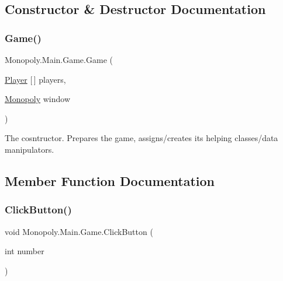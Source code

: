 \subsection{Constructor \& Destructor Documentation}
\mbox{\label{class_monopoly_1_1_main_1_1_game_ae2591415ce9bb2ca618cf67cc000792c}} 
\subsubsection{\texorpdfstring{Game()}{Game()}}
{\footnotesize\ttfamily Monopoly.\+Main.\+Game.\+Game (\begin{DoxyParamCaption}\item[{\mbox{\hyperlink{class_monopoly_1_1_players_1_1_player}{Player}} \mbox{[}$\,$\mbox{]}}]{players,  }\item[{\mbox{\hyperlink{class_monopoly_1_1_main_1_1_monopoly}{Monopoly}}}]{window }\end{DoxyParamCaption})\hspace{0.3cm}{\ttfamily [inline]}}

The cosntructor. Prepares the game, assigns/creates its helping classes/data manipulators. 

\subsection{Member Function Documentation}
\mbox{\label{class_monopoly_1_1_main_1_1_game_a2eacf89a5ff116f370fd4bab3dc6222a}} 
\subsubsection{\texorpdfstring{Click\+Button()}{ClickButton()}}
{\footnotesize\ttfamily void Monopoly.\+Main.\+Game.\+Click\+Button (\begin{DoxyParamCaption}\item[{int}]{number }\end{DoxyParamCaption})\hspace{0.3cm}{\ttfamily [inline]}}

